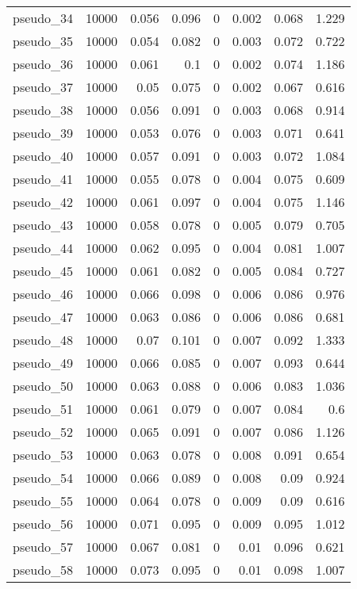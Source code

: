 \begin{table}[!htbp]
{\begin{tabular}{lrrrrrrr}
pseudo\_34 & 10000 & 0.056 & 0.096 & 0 & 0.002 & 0.068 & 1.229 \\ 
pseudo\_35 & 10000 & 0.054 & 0.082 & 0 & 0.003 & 0.072 & 0.722 \\ 
pseudo\_36 & 10000 & 0.061 & 0.1 & 0 & 0.002 & 0.074 & 1.186 \\ 
pseudo\_37 & 10000 & 0.05 & 0.075 & 0 & 0.002 & 0.067 & 0.616 \\ 
pseudo\_38 & 10000 & 0.056 & 0.091 & 0 & 0.003 & 0.068 & 0.914 \\ 
pseudo\_39 & 10000 & 0.053 & 0.076 & 0 & 0.003 & 0.071 & 0.641 \\ 
pseudo\_40 & 10000 & 0.057 & 0.091 & 0 & 0.003 & 0.072 & 1.084 \\ 
pseudo\_41 & 10000 & 0.055 & 0.078 & 0 & 0.004 & 0.075 & 0.609 \\ 
pseudo\_42 & 10000 & 0.061 & 0.097 & 0 & 0.004 & 0.075 & 1.146 \\ 
pseudo\_43 & 10000 & 0.058 & 0.078 & 0 & 0.005 & 0.079 & 0.705 \\ 
pseudo\_44 & 10000 & 0.062 & 0.095 & 0 & 0.004 & 0.081 & 1.007 \\ 
pseudo\_45 & 10000 & 0.061 & 0.082 & 0 & 0.005 & 0.084 & 0.727 \\ 
pseudo\_46 & 10000 & 0.066 & 0.098 & 0 & 0.006 & 0.086 & 0.976 \\ 
pseudo\_47 & 10000 & 0.063 & 0.086 & 0 & 0.006 & 0.086 & 0.681 \\ 
pseudo\_48 & 10000 & 0.07 & 0.101 & 0 & 0.007 & 0.092 & 1.333 \\ 
pseudo\_49 & 10000 & 0.066 & 0.085 & 0 & 0.007 & 0.093 & 0.644 \\ 
pseudo\_50 & 10000 & 0.063 & 0.088 & 0 & 0.006 & 0.083 & 1.036 \\ 
pseudo\_51 & 10000 & 0.061 & 0.079 & 0 & 0.007 & 0.084 & 0.6 \\ 
pseudo\_52 & 10000 & 0.065 & 0.091 & 0 & 0.007 & 0.086 & 1.126 \\ 
pseudo\_53 & 10000 & 0.063 & 0.078 & 0 & 0.008 & 0.091 & 0.654 \\ 
pseudo\_54 & 10000 & 0.066 & 0.089 & 0 & 0.008 & 0.09 & 0.924 \\ 
pseudo\_55 & 10000 & 0.064 & 0.078 & 0 & 0.009 & 0.09 & 0.616 \\ 
pseudo\_56 & 10000 & 0.071 & 0.095 & 0 & 0.009 & 0.095 & 1.012 \\ 
pseudo\_57 & 10000 & 0.067 & 0.081 & 0 & 0.01 & 0.096 & 0.621 \\ 
pseudo\_58 & 10000 & 0.073 & 0.095 & 0 & 0.01 & 0.098 & 1.007 \\ 

\end{tabular}}
\end{table}
